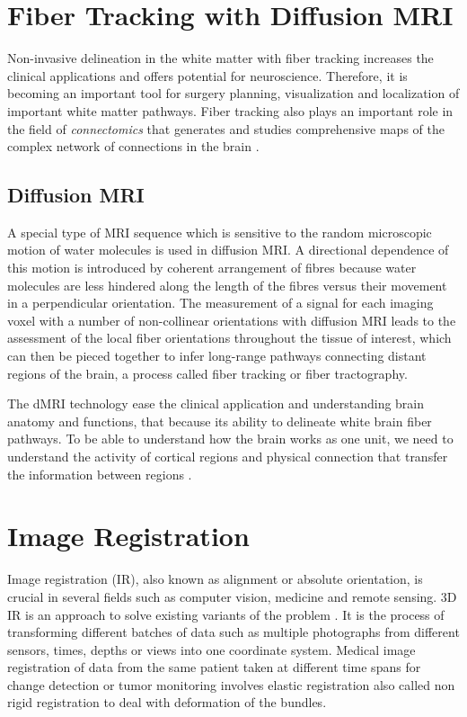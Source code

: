 \documentclass[../structure.tex]{subfiles}
\begin{document}
\section{Fiber Tracking with Diffusion MRI}
Non-invasive delineation in the white matter with fiber tracking increases the clinical applications and offers potential for neuroscience. Therefore, it is becoming an important tool for surgery planning, visualization and localization of important white matter pathways. Fiber tracking also plays an important role in the field of \textit{connectomics} that generates and studies comprehensive maps of the complex network of connections in the brain \cite{Jeurissen2017}.

\subsection{Diffusion MRI}
A special type of MRI sequence which is sensitive to the random microscopic motion of water molecules is used in diffusion MRI. A directional dependence of this motion is introduced by coherent arrangement of fibres because water molecules are less hindered along the length of the fibres versus their movement in a perpendicular orientation. The measurement of a signal for each imaging voxel with a number of non-collinear orientations with diffusion MRI leads to the assessment of the local fiber orientations throughout the tissue of interest, which can then be pieced together to infer long-range pathways connecting distant regions of the brain, a process called fiber tracking or fiber tractography.

The dMRI technology ease the clinical application and understanding brain anatomy and functions, that because its ability to delineate white brain fiber pathways. To be able to understand how the brain works as one unit, we need to understand the activity of cortical regions and physical connection that transfer the information between regions \cite{Jeurissen2017}.

\section{Image Registration}
Image registration (IR), also known as alignment or absolute orientation, is crucial in several fields such as computer vision, medicine and remote sensing. 3D IR is an approach to solve existing variants of the problem \cite{Cordon2006}. It is the process of transforming different batches of data such as multiple photographs from different sensors, times, depths or views into one coordinate system. Medical image registration of data from the same patient taken at different time spans for change detection or tumor monitoring involves elastic registration also called non rigid registration to deal with deformation of the bundles.
\end{document}
